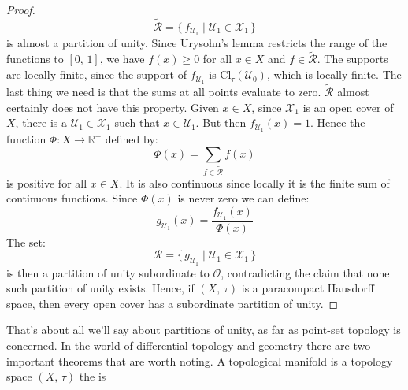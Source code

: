 \documentclass{article}
\theoremstyle{plain}
\theoremstyle{normal}
\begin{document}
\begin{proof}
\begin{equation}
                \tilde{\mathcal{R}}=
                \{\,f_{\mathcal{U}_{1}}\;|\;
                    \mathcal{U}_{1}\in\mathcal{X}_{1}\,\}
            \end{equation}
            is almost a partition of unity. Since Urysohn's lemma restricts the
            range of the functions to $[0,\,1]$, we have $f(x)\geq{0}$ for all
            $x\in{X}$ and $f\in\tilde{\mathcal{R}}$. The supports are locally
            finite, since the support of
            $f_{\mathcal{U}_{1}}$ is $\textrm{Cl}_{\tau}(\mathcal{U}_{0})$,
            which is locally finite. The last thing we need is that the sums at
            all points evaluate to zero. $\tilde{\mathcal{R}}$ almost certainly
            does not have this property. Given $x\in{X}$, since
            $\mathcal{X}_{1}$ is an open cover of $X$, there is a
            $\mathcal{U}_{1}\in\mathcal{X}_{1}$ such that $x\in\mathcal{U}_{1}$.
            But then $f_{\mathcal{U}_{1}}(x)=1$. Hence the function
            $\Phi:X\rightarrow\mathbb{R}^{+}$ defined by:
            \begin{equation}
                \Phi(x)=\sum_{f\in\tilde{\mathcal{R}}}f(x)
            \end{equation}
            is positive for all $x\in{X}$. It is also continuous since locally
            it is the finite sum of continuous functions. Since $\Phi(x)$ is
            never zero we can define:
            \begin{equation}
                g_{\mathcal{U}_{1}}(x)
                =\frac{f_{\mathcal{U}_{1}}(x)}{\Phi(x)}
            \end{equation}
            The set:
            \begin{equation}
                \mathcal{R}
                =\{\,g_{\mathcal{U}_{1}}\;|\;
                    \mathcal{U}_{1}\in\mathcal{X}_{1}\,\}
            \end{equation}
            is then a partition of unity subordinate to $\mathcal{O}$,
            contradicting the claim that none such partition of unity exists.
            Hence, if $(X,\,\tau)$ is a paracompact Hausdorff space, then
            every open cover has a subordinate partition of unity.
        \end{proof}
        That's about all we'll say about partitions of unity, as far as
        point-set topology is concerned. In the world of differential topology
        and geometry there are two important theorems that are worth noting.
        A topological manifold is a topology space $(X,\,\tau)$ the is
\end{document}

